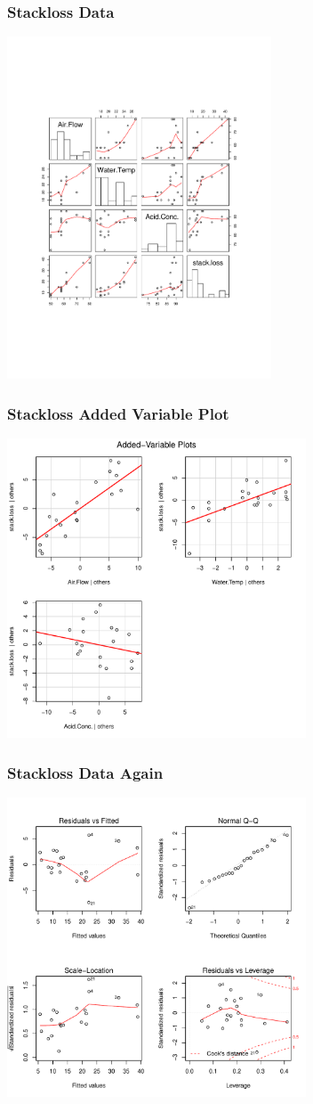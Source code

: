 \documentclass[]{beamer}
\begin{document}
  \begin{frame}
   \frametitle{Stackloss Data}
\vspace{-24pt}
    \centerline{\includegraphics[height=4in]{stackloss-pair}}
  \end{frame}
  \begin{frame}
    \frametitle{Stackloss Added Variable Plot}
    \centerline{\includegraphics[height=3.5in]{stackloss-avp}}
  \end{frame}
  \begin{frame}
    \frametitle{Stackloss Data Again}
    \centerline{\includegraphics[height=3.5in]{stackloss-resid}}
  \end{frame}
\end{document}
